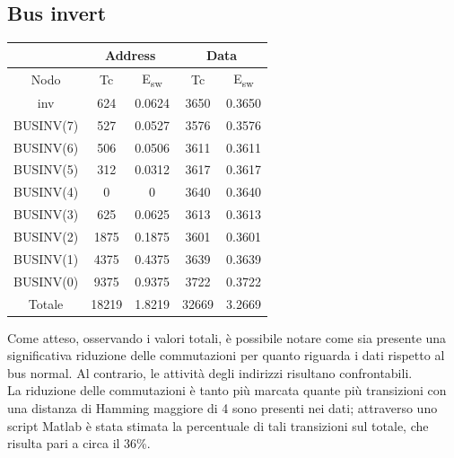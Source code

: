 \documentclass[11pt,  english, makeidx, a4paper, titlepage, oneside]{book}
\begin{document}
\subsection{Bus invert}
\begin{center}
	\begin{tabular}{|c|c|c||c|c|}
	\hline
	& \multicolumn{2}{|c||}{Address} & \multicolumn{2}{|c|}{Data}\\
	\hline
	Nodo & Tc & E\textsubscript{sw} & Tc & E\textsubscript{sw} \\
	\hline
	inv & 624 & 0.0624 & 3650 & 0.3650\\
	\hline
	BUSINV(7) & 527 & 0.0527 & 3576 & 0.3576\\
	 \hline
	BUSINV(6) & 506 & 0.0506 & 3611 & 0.3611\\
	\hline
	BUSINV(5) & 312 & 0.0312 & 3617 & 0.3617\\
	\hline
	BUSINV(4) & 0 & 0 & 3640 & 0.3640\\
	\hline
	BUSINV(3) & 625 & 0.0625 & 3613 & 0.3613\\
	\hline
	BUSINV(2) & 1875 & 0.1875 & 3601 & 0.3601\\
	\hline
	BUSINV(1) & 4375 & 0.4375 & 3639 & 0.3639\\
	\hline
	BUSINV(0) & 9375 & 0.9375 & 3722 & 0.3722\\
	\hline
	Totale & 18219 & 1.8219 & 32669 & 3.2669\\
	\hline
	\end{tabular}	
\end{center}
\vspace{0.3cm}
Come atteso, osservando i valori totali, è possibile notare come sia presente una significativa riduzione delle commutazioni per quanto riguarda i dati rispetto al bus normal. Al contrario, le attività degli indirizzi risultano confrontabili.
\\
La riduzione delle commutazioni è tanto più marcata quante più transizioni con una distanza di Hamming maggiore di 4 sono presenti nei dati; attraverso uno script Matlab è stata stimata la percentuale di tali transizioni sul totale, che risulta pari a circa il 36\%.
\end{document}
